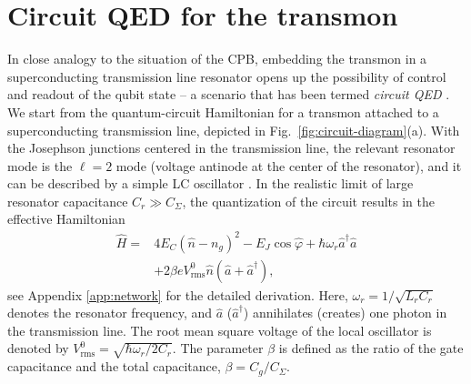 \documentclass[twocolumn,amsmath,amssymb,floatfix,pra,showpacs,eqsecnum,footinbib,superscriptaddress]{revtex4}
\newcounter{fig}
\begin{document}
\section{Circuit QED for the transmon\label{sec:cqed}}
In close analogy to the situation of the CPB, embedding the transmon in a superconducting transmission line resonator opens up the possibility of control and readout of the qubit state -- a scenario that has been termed \emph{circuit QED} \cite{wallraff,blais1}. We start from the quantum-circuit Hamiltonian for a transmon attached to a superconducting transmission line, depicted in Fig.\ \ref{fig:circuit-diagram}(a). With the Josephson junctions centered in the transmission line, the relevant resonator mode is the $\ell=2$ mode (voltage antinode at the center of the resonator), and it can be described by a simple LC oscillator \cite{blais1}. In the realistic limit of large resonator capacitance $C_r\gg C_\Sigma$, the quantization of the circuit results in the effective Hamiltonian
\begin{align}\label{ham1}
\hat{H}=&4E_C (\hat{n}-n_g)^2 - E_J \cos \hat{\varphi}   +\hbar\omega_r\hat{a}^\dag \hat{a}\nonumber\\
&+ 2\beta eV^0_\text{rms} \hat{n}(\hat{a}+\hat{a}^\dag),
\end{align}
see Appendix \ref{app:network} for the detailed derivation. Here, $\omega_r=1/\sqrt{L_rC_r}$ denotes the resonator frequency, and $\hat{a}$ ($\hat{a}^\dag$) annihilates (creates) one photon in the transmission line. The root mean square voltage of the local oscillator is denoted by $V^0_\text{rms}=\sqrt{\hbar\omega_r/2C_r}$. The parameter $\beta$ is defined as the ratio of the gate capacitance and the total capacitance,  $\beta=C_g/C_\Sigma$. 
\end{document}
